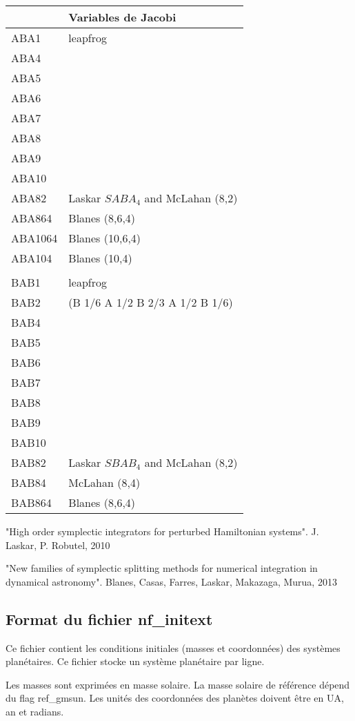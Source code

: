 \documentclass[11pt]{article}
\begin{document}
\begin{tabularx}{\textwidth}{|l|X|}
\hline
&Variables de Jacobi\\
\hline
ABA1& leapfrog\\
ABA4& \\
ABA5& \\
ABA6& \\
ABA7& \\
ABA8& \\
ABA9& \\
ABA10& \\
ABA82 & Laskar $SABA_4$ and McLahan (8,2) \\
ABA864  & Blanes (8,6,4) \\
ABA1064 & Blanes (10,6,4) \\
ABA104 & Blanes (10,4) \\
& \\
BAB1& leapfrog\\
BAB2& (B 1/6 A 1/2 B 2/3 A 1/2 B 1/6)\\
BAB4& \\
BAB5& \\
BAB6& \\
BAB7& \\
BAB8& \\
BAB9& \\
BAB10& \\
BAB82 &  Laskar $SBAB_4$ and McLahan (8,2) \\
BAB84 &  McLahan (8,4) \\
BAB864  & Blanes (8,6,4) \\
\hline
\end{tabularx}

"High order symplectic integrators for perturbed Hamiltonian systems".
J. Laskar, P. Robutel, 2010

"New families of symplectic splitting methods for numerical integration in dynamical astronomy". Blanes, Casas, Farres, Laskar, Makazaga, Murua, 2013 


\subsection{Format du fichier nf\_initext}

Ce fichier contient les conditions initiales (masses et coordonn\'ees) des syst\`emes plan\'etaires. 
Ce fichier stocke un syst\`eme plan\'etaire par ligne.

Les masses sont exprimées en masse solaire.  La masse solaire de référence dépend du flag ref\_gmsun. 
Les unit\'es des coordonn\'ees des plan\`etes doivent \^etre en UA, an et radians.
\end{document}
